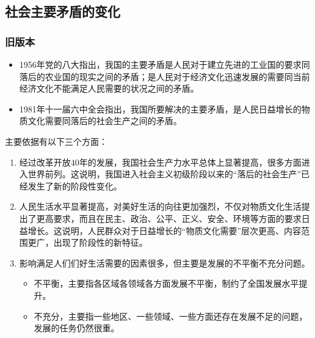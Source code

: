    \subsection{社会主要矛盾的变化}
        \subsubsection{旧版本}
        \begin{itemize}
            \item 1956年党的八大指出，我国的主要矛盾是人民对于建立先进的工业国的要求同落后的农业国的现实之间的矛盾；是人民对于经济文化迅速发展的需要同当前经济文化不能满足人民需要的状况之间的矛盾。
            \item 1981年十一届六中全会指出，我国所要解决的主要矛盾，是人民日益增长的物质文化需要同落后的社会生产之间的矛盾。
        \end{itemize}


        主要依据有以下三个方面：
        \begin{enumerate}
            \item 经过改革开放40年的发展，我国社会生产力水平总体上显著提高，很多方面进入世界前列。这说明，我国进入社会主义初级阶段以来的“落后的社会生产”已经发生了新的阶段性变化。
            \item 人民生活水平显著提高，对美好生活的向往更加强烈，不仅对物质文化生活提出了更高要求，而且在民主、政治、公平、正义、安全、环境等方面的要求日益增长。这说明，人民群众对于日益增长的“物质文化需要”层次更高、内容范围更广，出现了阶段性的新特征。
            \item 影响满足人们们好生活需要的因素很多，但主要是发展的不平衡不充分问题。
            \begin{itemize}
                \item 不平衡，主要指各区域各领域各方面发展不平衡，制约了全国发展水平提升。
                \item 不充分，主要指一些地区、一些领域、一些方面还存在发展不足的问题，发展的任务仍然很重。
            \end{itemize}
        \end{enumerate}


